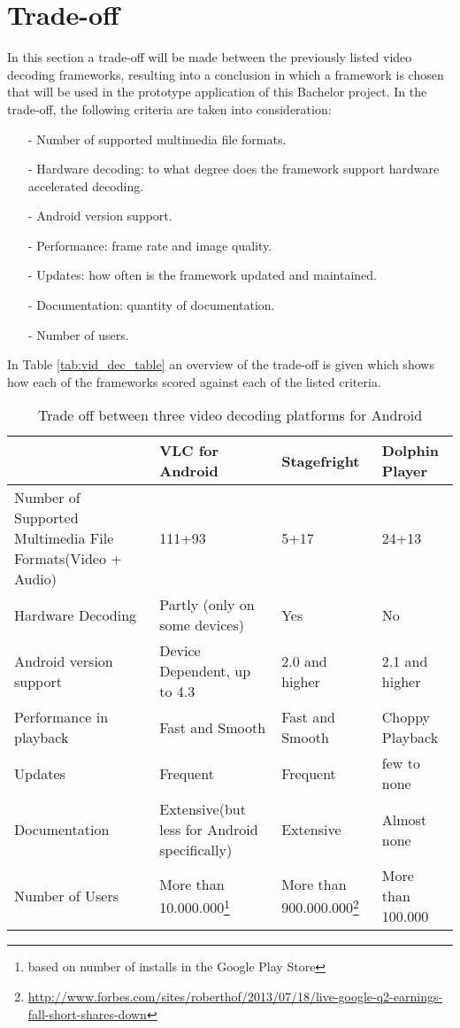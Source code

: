 \section{Trade-off}
In this section a trade-off will be made between the previously listed video decoding frameworks, resulting into a conclusion in which a framework is chosen that will be used in the prototype application of this Bachelor project. In the trade-off, the following criteria are taken into consideration:
\begin{itemize}
	\item[-]Number of supported multimedia file formats.
	\item[-]Hardware decoding: to what degree does the framework support hardware accelerated decoding. 
	\item[-]Android version support.
	\item[-]Performance: frame rate and image quality.
	\item[-]Updates: how often is the framework updated and maintained.
	\item[-]Documentation: quantity of documentation. 
	\item[-]Number of users.
\end{itemize}
In Table \ref{tab:vid_dec_table} an overview of the trade-off is given which shows how each of the frameworks scored against each of the listed criteria.\\
\begin{table}[h]
\caption{Trade off between three video decoding platforms for Android \label{tab:vid_dec_table}}
	\begin{tabularx}{\textwidth}{| X|X|X|X |}
	\hline
	& VLC for Android & Stagefright & Dolphin Player \\ \hline
	Number of Supported Multimedia File Formats(Video + Audio)
	& 111+93
	& 5+17
	& 24+13 \\ \hline
	Hardware Decoding 
	& Partly (only on some devices)
	& Yes
	& No \\ \hline
	Android version support
	& Device Dependent, up to 4.3
	& 2.0 and higher
	& 2.1 and higher \\ \hline
	Performance in playback
	& Fast and Smooth
	& Fast and Smooth
	& Choppy Playback \\ \hline
	Updates
	& Frequent
	& Frequent
	& few to none \\ \hline
	Documentation
	& Extensive(but less for Android specifically)
	& Extensive
	& Almost none \\ \hline
	Number of Users
	& More than 10.000.000\footnote{\label{install}based on number of installs in the Google Play Store}
	& More than 900.000.000\footnote{\url{http://www.forbes.com/sites/roberthof/2013/07/18/live-google-q2-earnings-fall-short-shares-down}}
	& More than 100.000\footnotemark{[\ref{install}]} \\ \hline
	\end{tabularx}
\end{table}
